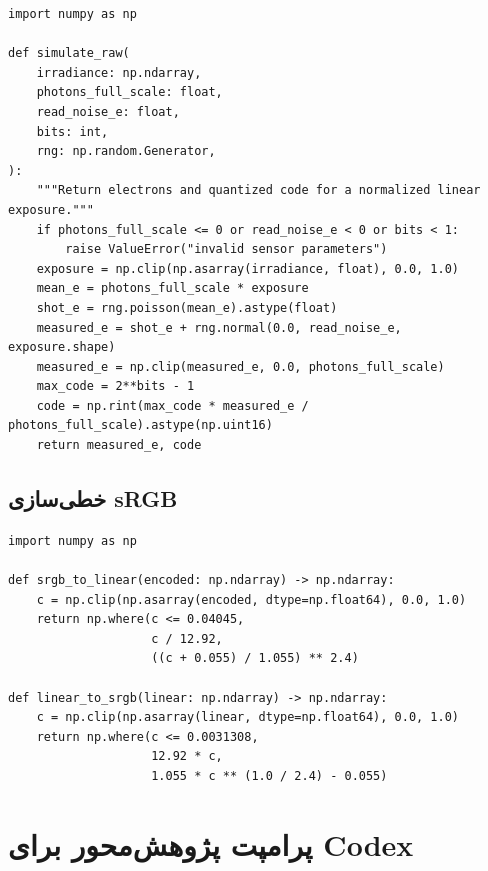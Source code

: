 \documentclass[12pt,openany,oneside]{book}
\begin{document}
\begin{LTR}
\begin{lstlisting}
import numpy as np

def simulate_raw(
    irradiance: np.ndarray,
    photons_full_scale: float,
    read_noise_e: float,
    bits: int,
    rng: np.random.Generator,
):
    """Return electrons and quantized code for a normalized linear exposure."""
    if photons_full_scale <= 0 or read_noise_e < 0 or bits < 1:
        raise ValueError("invalid sensor parameters")
    exposure = np.clip(np.asarray(irradiance, float), 0.0, 1.0)
    mean_e = photons_full_scale * exposure
    shot_e = rng.poisson(mean_e).astype(float)
    measured_e = shot_e + rng.normal(0.0, read_noise_e, exposure.shape)
    measured_e = np.clip(measured_e, 0.0, photons_full_scale)
    max_code = 2**bits - 1
    code = np.rint(max_code * measured_e / photons_full_scale).astype(np.uint16)
    return measured_e, code
\end{lstlisting}
\end{LTR}

\subsection{خطی‌سازی sRGB}

\begin{LTR}
\begin{lstlisting}
import numpy as np

def srgb_to_linear(encoded: np.ndarray) -> np.ndarray:
    c = np.clip(np.asarray(encoded, dtype=np.float64), 0.0, 1.0)
    return np.where(c <= 0.04045,
                    c / 12.92,
                    ((c + 0.055) / 1.055) ** 2.4)

def linear_to_srgb(linear: np.ndarray) -> np.ndarray:
    c = np.clip(np.asarray(linear, dtype=np.float64), 0.0, 1.0)
    return np.where(c <= 0.0031308,
                    12.92 * c,
                    1.055 * c ** (1.0 / 2.4) - 0.055)
\end{lstlisting}
\end{LTR}

\section{پرامپت پژوهش‌محور برای Codex}
\end{document}
